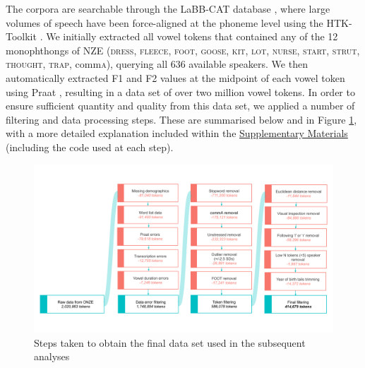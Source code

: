 \documentclass[review]{elsarticle} %
\begin{document}
The corpora are searchable through the LaBB-CAT database \citep{fromont2008onze}, where large volumes of speech have been force-aligned at the phoneme level using the HTK-Toolkit \citep{young2002htk}. We initially extracted all vowel tokens that contained any of the 12 monophthongs of NZE (\textsc{dress, fleece, foot, goose, kit, lot, nurse, start, strut, thought, trap}, comm\textsc{a}), querying all 636 available speakers. We then automatically extracted F1 and F2 values at the midpoint of each vowel token using Praat \citep{praat2018}, resulting in a data set of over two million vowel tokens. In order to ensure sufficient quantity and quality from this data set, we applied a number of filtering and data processing steps. These are summarised below and in Figure \ref{fig:data_filtering}, with a more detailed explanation included within the \hyperref[sec:supplementarymaterials]{Supplementary Materials} (including the code used at each step).


\begin{figure}[!t]
\includegraphics[width=\textwidth]{Figures/Data_filtering.png}
\caption{Steps taken to obtain the final data set used in the subsequent analyses}
\label{fig:data_filtering}
\end{figure}

\end{document}
